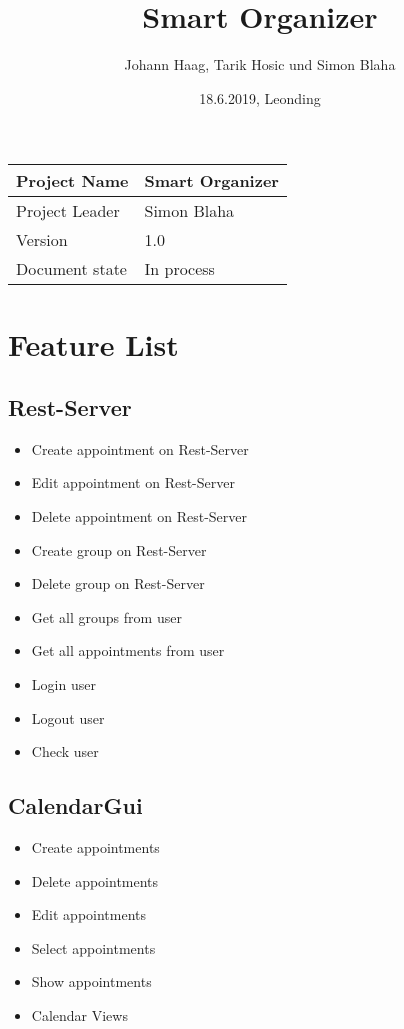 \documentclass[12pt]{scrartcl}
\title{Smart Organizer}
\author{Johann Haag, Tarik Hosic und Simon Blaha}
\date{18.6.2019, Leonding}
\begin{document}
    \maketitle
    \begin{flushleft}
    \begin{tabular}{|l|l|}
    \hline
    Project Name & Smart Organizer \\ \hline
    Project Leader & Simon Blaha \\ \hline
    Version & 1.0\\ \hline
    Document state & In process \\ \hline
    \end{tabular}
    \end{flushleft}

    \pagebreak
    \tableofcontents
    \pagebreak

    \section{Feature List}
    \subsection{Rest-Server}
    \begin{itemize}
        \item Create appointment on Rest-Server
        \item Edit appointment on Rest-Server
        \item Delete appointment on Rest-Server
        \item Create group on Rest-Server
        \item Delete group on Rest-Server
        \item Get all groups from user
        \item Get all appointments from user
        \item Login user 
        \item Logout user 
        \item Check user
    \end{itemize}
    \subsection{CalendarGui}
    \begin{itemize}
        \item Create appointments
        \item Delete appointments
        \item Edit appointments
        \item Select appointments
        \item Show appointments
        \item Calendar Views
    \end{itemize}
\end{document}
